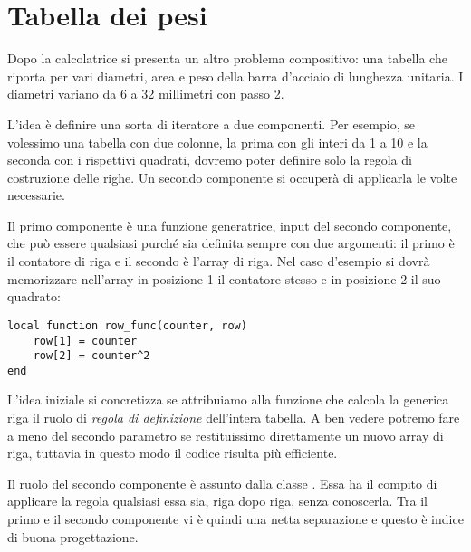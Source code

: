 
\section{Tabella dei pesi}

Dopo la calcolatrice si presenta un altro problema compositivo: una tabella che
riporta per vari diametri, area e peso della barra d'acciaio di lunghezza
unitaria. I diametri variano da 6 a 32 millimetri con passo 2.

L'idea è definire una sorta di iteratore a due componenti. Per esempio, se
volessimo una tabella con due colonne, la prima con gli interi da 1 a 10 e la
seconda con i rispettivi quadrati, dovremo poter definire solo la regola di
costruzione delle righe. Un secondo componente si occuperà di applicarla le
volte necessarie.

Il primo componente è una funzione generatrice, input del secondo componente,
che può essere qualsiasi purché sia definita sempre con due argomenti: il primo
è il contatore di riga e il secondo è l'array di riga. Nel caso d'esempio si
dovrà memorizzare nell'array in posizione 1 il contatore stesso e in posizione 2
il suo quadrato:
\begin{Verbatim}
local function row_func(counter, row)
    row[1] = counter
    row[2] = counter^2
end
\end{Verbatim}

L'idea iniziale si concretizza se attribuiamo alla funzione che calcola la
generica riga il ruolo di \emph{regola di definizione} dell'intera tabella. A
ben vedere potremo fare a meno del secondo parametro  se restituissimo
direttamente un nuovo array di riga, tuttavia in questo modo il codice risulta
più efficiente.

Il ruolo del secondo componente è assunto dalla classe . Essa ha il
compito di applicare la regola qualsiasi essa sia, riga dopo riga, senza
conoscerla. Tra il primo e il secondo componente vi è quindi una netta
separazione e questo è indice di buona progettazione.


